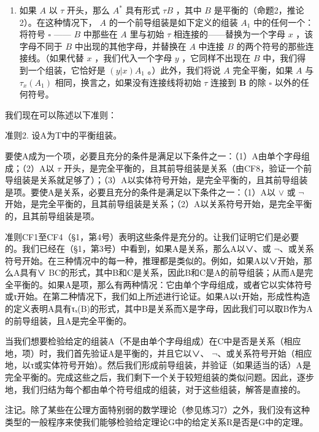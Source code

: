 \begin{enumerate}
\def\labelenumi{(\arabic{enumi})}
\setcounter{enumi}{1}
\tightlist
\item
  如果 \(A\) 以 \(\tau\) 开头，那么 \(A^*\) 具有形式 \(\tau B\) ，其中 \(B\) 是平衡的（命题2，推论2）。在这种情况下， \(A\) 的一个前导组装是如下定义的组装 \(A_1\) 中的任何一个：将符号 \(\square\) —— \(B\) 中那些在 \(A\) 里与初始 \(\tau\) 相连接的——替换为一个字母 \(x\) ，该字母不同于 \(B\) 中出现的其他字母，并替换在 \(A\) 中连接 \(B\) 的两个符号的那些连接线。（如果代替 \(x\) ，我们代入一个字母 \(y\) ，它同样不出现在 \(B\) 中，我们得到一个组装，它恰好是 \((y|x)A_1\) 。）此外，我们将说 \(A\) 完全平衡，如果 \(A\) 与 \(\tau_{x}(A_1)\) 相同，换言之，如果没有连接线将初始 \(\tau\) 连接到 \(\pmb{B}\) 的除 \(\square\) 以外的任何符号。
\end{enumerate}

我们现在可以陈述以下准则：

准则2. 设A为T中的平衡组装。

要使A成为一个项，必要且充分的条件是满足以下条件之一：（1）A由单个字母组成；（2）A以 \(\tau\) 开头，是完全平衡的，且其前导组装是关系（由CF8，验证一个前导组装是关系就足够了）；（3）A以实体符号开始，是完全平衡的，且其前导组装是项。要使A是关系，必要且充分的条件是满足以下条件之一：（1）A以 \(\vee\) 或 \(\neg\) 开始，是完全平衡的，且其前导组装是关系；（2）A以关系符号开始，是完全平衡的，且其前导组装是项。

准则CF1至CF4（§1，第4号）表明这些条件是充分的。让我们证明它们是必要的。我们已经在（§1，第3号）中看到，如果A是关系，那么A以∨、或 \(\neg\)、或关系符号开始。在三种情况中的每一种，推理都是类似的。例如，如果A以∨开始，那么A具有∨ BC的形式，其中B和C是关系，因此B和C是A的前导组装；从而A是完全平衡的。如果A是项，那么有两种情况：它由单个字母组成，或者它以实体符号或τ开始。在第二种情况下，我们如上所述进行论证。如果A以τ开始，形成性构造的定义表明A具有τₓ(B)的形式，其中B是关系而X是字母，因此我们可以取B作为A的前导组装，且A是完全平衡的。

当我们想要检验给定的组装A（不是由单个字母组成）在C中是否是关系（相应地，项）时，我们首先验证A是平衡的，并且它以∨、 \(\neg\)、或关系符号开始（相应地，以τ或实体符号开始）。然后我们形成前导组装，并验证（如果适当的话）A是完全平衡的。完成这些之后，我们剩下一个关于较短组装的类似问题。因此，逐步地，我们归结为每个都由单个符号组成的组装，对于这些组装，解答是直接的。

注记。除了某些在公理方面特别弱的数学理论（参见练习7）之外，我们没有这种类型的一般程序来使我们能够检验给定理论G中的给定关系R是否是G中的定理。


